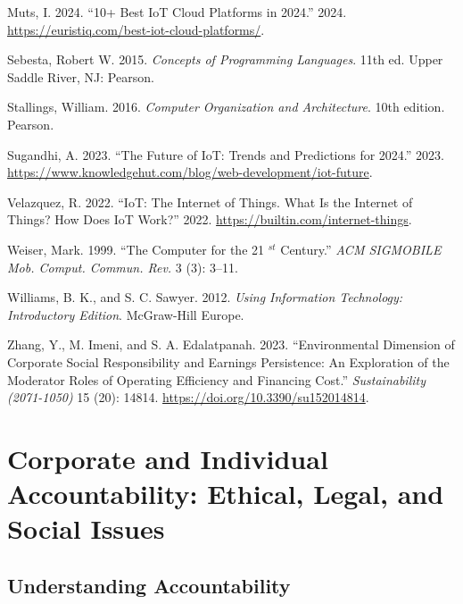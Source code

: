 \documentclass[
  letterpaper,
  DIV=11,
  numbers=noendperiod]{scrreprt}
\newlength{\cslhangindent}
\newenvironment{CSLReferences}[2] %
 {\begin{list}{}{%
  \setlength{\itemindent}{0pt}
  \setlength{\leftmargin}{0pt}
  \setlength{\parsep}{0pt}
  \ifodd #1
   \setlength{\leftmargin}{\cslhangindent}
   \setlength{\itemindent}{-1\cslhangindent}
  \fi
  \setlength{\itemsep}{#2\baselineskip}}}
 {\end{list}}
\begin{document}
\begin{CSLReferences}{1}{0}
Muts, I. 2024. {``10+ Best IoT Cloud Platforms in 2024.''} 2024.
\url{https://euristiq.com/best-iot-cloud-platforms/}.

Sebesta, Robert W. 2015. \emph{Concepts of Programming Languages}. 11th
ed. Upper Saddle River, NJ: Pearson.

Stallings, William. 2016. \emph{Computer Organization and Architecture}.
10th edition. Pearson.

Sugandhi, A. 2023. {``The Future of IoT: Trends and Predictions for
2024.''} 2023.
\url{https://www.knowledgehut.com/blog/web-development/iot-future}.

Velazquez, R. 2022. {``IoT: The Internet of Things. What Is the Internet
of Things? How Does IoT Work?''} 2022.
\url{https://builtin.com/internet-things}.

Weiser, Mark. 1999. {``The Computer for the 21 \(^{st}\) Century.''}
\emph{ACM SIGMOBILE Mob. Comput. Commun. Rev.} 3 (3): 3--11.

Williams, B. K., and S. C. Sawyer. 2012. \emph{Using Information
Technology: Introductory Edition}. McGraw-Hill Europe.

Zhang, Y., M. Imeni, and S. A. Edalatpanah. 2023. {``Environmental
Dimension of Corporate Social Responsibility and Earnings Persistence:
An Exploration of the Moderator Roles of Operating Efficiency and
Financing Cost.''} \emph{Sustainability (2071-1050)} 15 (20): 14814.
\url{https://doi.org/10.3390/su152014814}.

\end{CSLReferences}


\chapter{Corporate and Individual Accountability: Ethical, Legal, and
Social
Issues}\label{corporate-and-individual-accountability-ethical-legal-and-social-issues}

\section{Understanding
Accountability}\label{understanding-accountability}
\end{document}
